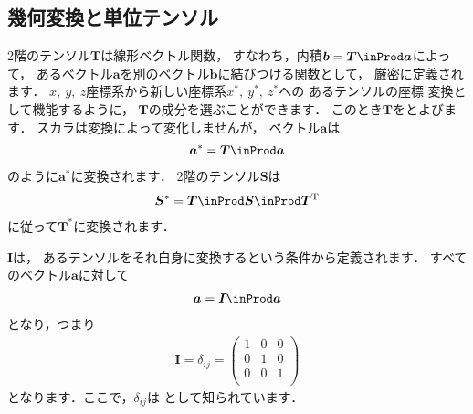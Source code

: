 \subsection{幾何変換と単位テンソル}
\label{ssec:1.3.7}
2階のテンソル$\bm{T}$は線形ベクトル関数，
すなわち，内積$\bm{b} = \bm{T} \inProd \bm{a}$によって，
あるベクトル$\bm{a}$を別のベクトル$\bm{b}$に結びつける関数として，
厳密に定義されます．
$x,\ y,\ z$座標系から新しい座標系$x^{*},\ y^{*},\ z^{*}$への
あるテンソルの座標
%
%
変換として機能するように，
$\bm{T}$の成分を選ぶことができます．
このとき$\bm{T}$をとよびます．
スカラは変換によって変化しませんが，
ベクトル$\bm{a}$は
\begin{align}
 \label{eq:1.25}
 \bm{a}^{*} = \bm{T} \inProd \bm{a}
\end{align}
のように$\bm{a}^{*}$に変換されます．
2階のテンソル$\bm{S}$は
\begin{align}
 \label{eq:1.26}
 \bm{S}^{*} = \bm{T} \inProd \bm{S} \inProd \bm{T}^{\mathrm{T}}
\end{align}
に従って$\bm{T}^{*}$に変換されます．

%
$\bm{I}$は，
あるテンソルをそれ自身に変換するという条件から定義されます．
すべてのベクトル$\bm{a}$に対して
\begin{align}
 \label{eq:1.27}
 \bm{a} = \bm{I} \inProd \bm{a}
\end{align}
となり，つまり
\begin{align}
 \label{eq:1.28}
 \bm{I} = \delta_{ij} =
 \begin{pmatrix}
  1 & 0 & 0 \\
  0 & 1 & 0 \\
  0 & 0 & 1 \\
 \end{pmatrix}
\end{align}
となります．ここで，$\delta_{ij}$は
%
として知られています．


